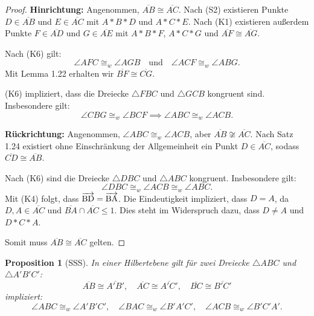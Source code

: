 \documentclass[a4paper,12pt]{article}
\theoremstyle{break}
\newtheorem{proposition}[definition]{Proposition}
\begin{document}
\begin{proof}
\textbf{Hinrichtung:} Angenommen, \(\overline{AB} \cong \overline{AC}\). Nach (S2) existieren Punkte \(D \in \overline{AB}\) und \(E \in \overline{AC}\) mit \(A * B * D\) und \(A * C * E\). Nach (K1) existieren außerdem Punkte \(F \in \overline{AD}\) und \(G \in \overline{AE}\) mit \(A * B * F\), \(A * C * G\) und \(\overline{AF} \cong \overline{AG}\).

Nach (K6) gilt:
\[
\angle AFC \cong_w \angle AGB \quad \text{und} \quad \angle ACF \cong_w \angle ABG.
\]
Mit Lemma 1.22 erhalten wir \(\overline{BF} \cong \overline{CG}\). 

(K6) impliziert, dass die Dreiecke \(\triangle FBC\) und \(\triangle GCB\) kongruent sind. Insbesondere gilt:
\[
\angle CBG \cong_w \angle BCF \implies \angle ABC \cong_w \angle ACB.
\]

\textbf{Rückrichtung:} Angenommen, \(\angle ABC \cong_w \angle ACB\), aber \(\overline{AB} \not\cong \overline{AC}\). Nach Satz 1.24 existiert ohne Einschränkung der Allgemeinheit ein Punkt \(D \in \overline{AC}\), sodass \(\overline{CD} \cong \overline{AB}\).

Nach (K6) sind die Dreiecke \(\triangle DBC\) und \(\triangle ABC\) kongruent. Insbesondere gilt:
\[
\angle DBC \cong_w \angle ACB \cong_w \angle ABC.
\]
Mit (K4) folgt, dass \(\overrightarrow{\rm BD} = \overrightarrow{\rm BA}\). Die Eindeutigkeit impliziert, dass \(D = A\), da \(D, A \in \overline{AC}\) und \(\overline{BA} \cap \overline{AC} \leq 1\). Dies steht im Widerspruch dazu, dass \(D \neq A\) und \(D * C * A\).

Somit muss \(\overline{AB} \cong \overline{AC}\) gelten.
\end{proof}

\begin{proposition}[SSS]
In einer Hilbertebene gilt für zwei Dreiecke \(\triangle ABC\) und \(\triangle A'B'C'\):
\[
\overline{AB} \cong \overline{A'B'}, \quad \overline{AC} \cong \overline{A'C'}, \quad \overline{BC} \cong \overline{B'C'}
\]
impliziert:
\[
\angle ABC \cong_w \angle A'B'C', \quad \angle BAC \cong_w \angle B'A'C', \quad \angle ACB \cong_w \angle B'C'A'.
\]
\end{proposition}
\end{document}
